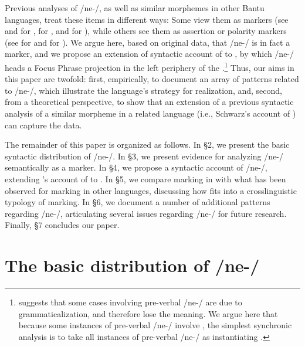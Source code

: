 \documentclass[output=paper,modfonts]{langscibook}
\begin{document}
Previous analyses of  /ne-/, as well as similar morphemes in other Bantu languages, treat these items in different ways: Some view them as  markers (see \citealt{Cammenga2004} and \citealt{Mwita2008} for , \citealt{Schwarz2007} for , and \citealt{AbelsMuriungi2008} for ), while others see them as assertion or polarity markers (see \citealt{Bergvall1987} for  and \citealt{Eslinger2013} for ). We argue here, based on original data, that /ne-/ is in fact a  marker, and we propose an extension of  syntactic account of  to , by which /ne-/ heads a Focus Phrase projection in the left periphery of the .\footnote{\citet{Mwita2008} suggests that some cases involving pre-verbal /ne-/ are due to grammaticalization, and therefore lose the  meaning. We argue here that because some instances of pre-verbal /ne-/ involve , the simplest synchronic analysis is to take all instances of pre-verbal /ne-/ as instantiating .} Thus, our aims in this paper are twofold: first, empirically, to document an array of patterns related to   /ne-/, which illustrate the language’s strategy for  realization, and, second, from a theoretical perspective, to show that an extension of a previous syntactic analysis of a similar morpheme in a related language (i.e., Schwarz's account of ) can capture the  data.

The remainder of this paper is organized as follows. In §2, we present the basic syntactic distribution of /ne-/. In §3, we present evidence for analyzing /ne-/ semantically as a  marker. In §4, we propose a syntactic account of /ne-/, extending \citet{Schwarz2007}’s account of  to . In §5, we compare  marking in  with what has been observed for  marking in other languages, discussing how  fits into a crosslinguistic typology of  marking. In §6, we document a number of additional patterns regarding /ne-/, articulating several issues regarding /ne-/ for future research. Finally, §7 concludes our paper.



\section{The basic distribution of /ne-/}
\largerpage[-1]
 
\end{document}
